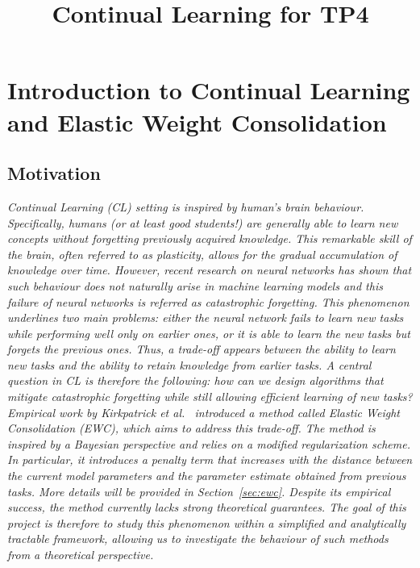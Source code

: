 \documentclass[11pt]{article}
\title{\bf Continual Learning for TP4}
\author{}
\date{}
\begin{document}
\maketitle
\tableofcontents

\section{Introduction to Continual Learning and Elastic Weight Consolidation}


\subsection{Motivation}

\textit{ Continual Learning (CL) setting is inspired by human's brain behaviour. Specifically, humans (or at least good students!) are generally able to learn new concepts without forgetting previously acquired knowledge. This remarkable skill of the brain, often referred to as \textit{plasticity}, allows for the gradual accumulation of knowledge over time. However, recent research on neural networks has shown that such behaviour does not naturally arise in machine learning models and this failure of neural networks is referred as \textit{catastrophic forgetting}. This phenomenon underlines two main problems: either the neural network fails to learn new tasks while performing well only on earlier ones, or it is able to learn the new tasks but forgets the previous ones. Thus, a trade-off appears between the ability to learn new tasks and the ability to retain knowledge from earlier tasks. A central question in CL is therefore the following: how can we design algorithms that mitigate catastrophic forgetting while still allowing efficient learning of new tasks? 
Empirical work by Kirkpatrick et al.~\cite{Kirkpatrick_2017} introduced a method called \emph{Elastic Weight Consolidation (EWC)}, which aims to address this trade-off. The method is inspired by a Bayesian perspective and relies on a modified regularization scheme. In particular, it introduces a penalty term that increases with the distance between the current model parameters and the parameter estimate obtained from previous tasks. More details will be provided in Section~\ref{sec:ewc}. Despite its empirical success, the method currently lacks strong theoretical guarantees. The goal of this project is therefore to study this phenomenon within a simplified and analytically tractable framework, allowing us to investigate the behaviour of such methods from a theoretical perspective.}
\end{document}
